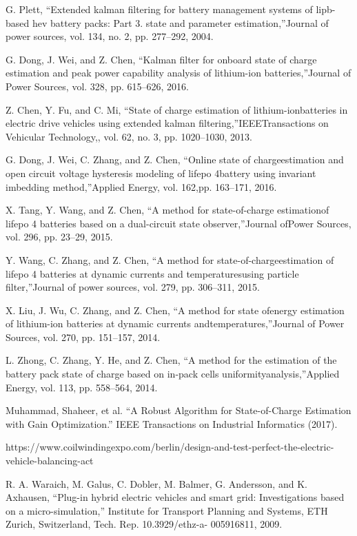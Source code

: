 G. Plett, ``Extended  kalman  filtering  for  battery  management  systems  of lipb-based  hev  battery  packs:  Part  3.  state  and  parameter  estimation,”Journal of power sources, vol. 134, no. 2, pp. 277–292, 2004.

 G. Dong, J. Wei, and Z. Chen, ``Kalman filter for onboard state of charge estimation and peak power capability analysis of lithium-ion batteries,”Journal of Power Sources, vol. 328, pp. 615–626, 2016.

Z.  Chen,  Y.  Fu,  and  C.  Mi,  ``State  of  charge  estimation  of  lithium-ionbatteries in electric drive vehicles using extended kalman filtering,”IEEETransactions  on  Vehicular  Technology,,  vol.  62,  no.  3,  pp.  1020–1030, 2013.

 G.  Dong,  J.  Wei,  C.  Zhang,  and  Z.  Chen,  ``Online  state  of  chargeestimation  and  open  circuit  voltage  hysteresis  modeling  of  lifepo  4battery  using  invariant  imbedding  method,”Applied  Energy,  vol.  162,pp. 163–171, 2016.

  X. Tang, Y. Wang, and Z. Chen, ``A method for state-of-charge estimationof lifepo 4 batteries based  on a dual-circuit state observer,”Journal ofPower Sources, vol. 296, pp. 23–29, 2015.

  Y.  Wang,  C.  Zhang,  and  Z.  Chen,  ``A  method  for  state-of-chargeestimation  of  lifepo  4  batteries  at  dynamic  currents  and  temperaturesusing particle filter,”Journal of power sources, vol. 279, pp. 306–311, 2015.

  X.  Liu,  J.  Wu,  C.  Zhang,  and  Z.  Chen,  ``A  method  for  state  ofenergy  estimation  of  lithium-ion  batteries  at  dynamic  currents  andtemperatures,”Journal of Power Sources, vol. 270, pp. 151–157, 2014.

  L. Zhong, C. Zhang, Y. He, and Z. Chen, ``A method for the estimation  of  the  battery  pack  state  of  charge  based  on  in-pack  cells  uniformityanalysis,”Applied Energy, vol. 113, pp. 558–564, 2014.
  
  Muhammad, Shaheer, et al. ``A Robust Algorithm for State-of-Charge Estimation with Gain Optimization.'' IEEE Transactions on Industrial Informatics (2017).
  
  https://www.coilwindingexpo.com/berlin/design-and-test-perfect-the-electric-vehicle-balancing-act
  
  R. A. Waraich, M. Galus, C. Dobler, M. Balmer, G. Andersson, and K.
Axhausen, ``Plug-in hybrid electric vehicles and smart grid: Investigations
based on a micro-simulation,” Institute for Transport Planning
and Systems, ETH Zurich, Switzerland, Tech. Rep. 10.3929/ethz-a-
005916811, 2009.

